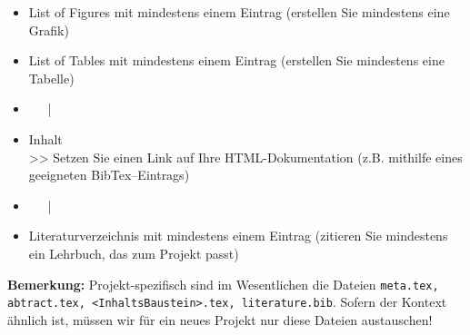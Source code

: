 \begin{enumerate}
\begin{itemize}
		      \item List of Figures mit mindestens einem Eintrag (erstellen Sie mindestens eine Grafik)
		      \item List of Tables mit mindestens einem Eintrag (erstellen Sie mindestens eine Tabelle)
		      \item[] ~~~|
		      \item[] Inhalt\\
		            \hspace*{0.5cm}>> Setzen Sie einen Link auf Ihre HTML-Dokumentation (z.B. mithilfe eines geeigneten BibTex--Eintrags)
		      \item[] ~~~|
		      \item Literaturverzeichnis mit mindestens einem Eintrag (zitieren Sie mindestens ein Lehrbuch, das zum Projekt passt)
	      \end{itemize}
\end{enumerate}
\small
\textbf{Bemerkung:}
Projekt-spezifisch sind im Wesentlichen die Dateien \texttt{meta.tex, abtract.tex, <InhaltsBaustein>.tex, literature.bib}. Sofern der Kontext ähnlich ist, müssen wir für ein neues Projekt nur diese Dateien austauschen!


